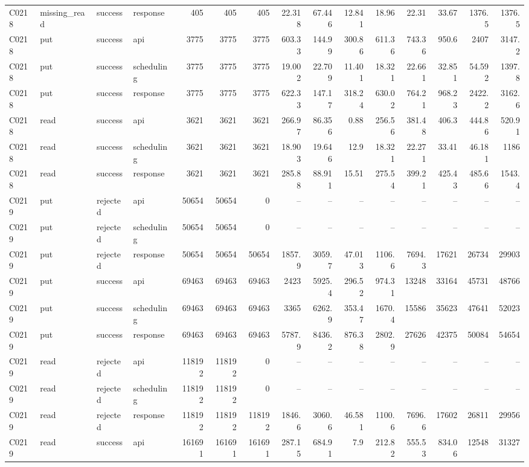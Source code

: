 \begin{landscape}
\begin{longtable}{llllrrrrrrrrrrr}
C0218 & missing\_\allowbreak{}read & success & response & 405 & 405 & 405 & 22.318 & 67.446 & 12.841 & 18.96 & 22.31 & 33.67 & 1376.5 & 1376.5\\
C0218 & put & success & api & 3775 & 3775 & 3775 & 603.33 & 144.99 & 300.86 & 611.36 & 743.36 & 950.6 & 2407 & 3147.2\\
C0218 & put & success & scheduling & 3775 & 3775 & 3775 & 19.002 & 22.709 & 11.401 & 18.321 & 22.661 & 32.851 & 54.592 & 1397.8\\
C0218 & put & success & response & 3775 & 3775 & 3775 & 622.33 & 147.17 & 318.24 & 630.02 & 764.21 & 968.23 & 2422.2 & 3162.6\\
C0218 & read & success & api & 3621 & 3621 & 3621 & 266.97 & 86.356 & 0.88 & 256.56 & 381.48 & 406.3 & 444.86 & 520.91\\
C0218 & read & success & scheduling & 3621 & 3621 & 3621 & 18.903 & 19.646 & 12.9 & 18.321 & 22.271 & 33.41 & 46.181 & 1186\\
C0218 & read & success & response & 3621 & 3621 & 3621 & 285.88 & 88.911 & 15.51 & 275.54 & 399.21 & 425.43 & 485.66 & 1543.4\\
C0219 & put & rejected & api & 50654 & 50654 & 0 & -- & -- & -- & -- & -- & -- & -- & --\\
C0219 & put & rejected & scheduling & 50654 & 50654 & 0 & -- & -- & -- & -- & -- & -- & -- & --\\
C0219 & put & rejected & response & 50654 & 50654 & 50654 & 1857.9 & 3059.7 & 47.013 & 1106.6 & 7694.3 & 17621 & 26734 & 29903\\
C0219 & put & success & api & 69463 & 69463 & 69463 & 2423 & 5925.4 & 296.52 & 974.31 & 13248 & 33164 & 45731 & 48766\\
C0219 & put & success & scheduling & 69463 & 69463 & 69463 & 3365 & 6262.9 & 353.47 & 1670.4 & 15586 & 35623 & 47641 & 52023\\
C0219 & put & success & response & 69463 & 69463 & 69463 & 5787.9 & 8436.2 & 876.38 & 2802.9 & 27626 & 42375 & 50084 & 54654\\
C0219 & read & rejected & api & 118192 & 118192 & 0 & -- & -- & -- & -- & -- & -- & -- & --\\
C0219 & read & rejected & scheduling & 118192 & 118192 & 0 & -- & -- & -- & -- & -- & -- & -- & --\\
C0219 & read & rejected & response & 118192 & 118192 & 118192 & 1846.6 & 3060.6 & 46.581 & 1100.6 & 7696.6 & 17602 & 26811 & 29956\\
C0219 & read & success & api & 161691 & 161691 & 161691 & 287.15 & 684.91 & 7.9 & 212.82 & 555.53 & 834.06 & 12548 & 31327\\

\end{longtable}
\end{landscape}
